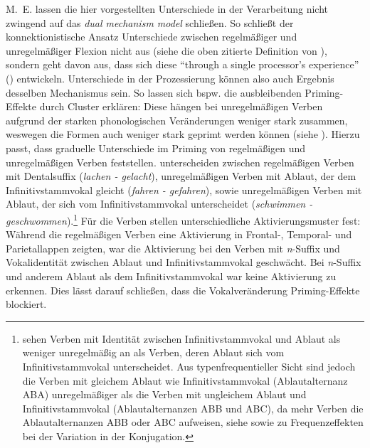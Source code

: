 M.~E. lassen die hier vorgestellten Unterschiede in der Verarbeitung nicht zwingend auf das \textit{dual mechanism model} schließen. So schließt der konnektionistische Ansatz Unterschiede zwischen regelmäßiger und unregelmäßiger Flexion nicht aus (siehe die oben zitierte Definition von \cite{Hare.2001}), sondern geht davon aus, dass sich diese "`through a single processor's experience"' (\cite[183]{Hare.2001}) entwickeln. Unterschiede in der Prozessierung können also auch Ergebnis desselben Mechanismus sein. So lassen sich bspw. die ausbleibenden Priming-Effekte durch Cluster erklären: Diese hängen bei unregelmäßigen Verben aufgrund der starken phonologischen Veränderungen weniger stark zusammen, weswegen die Formen auch weniger stark geprimt werden können (siehe ). Hierzu passt, dass \textcite{Smolka.2013} graduelle Unterschiede im Priming von regelmäßigen und unregelmäßigen Verben feststellen. \textcite[6--9]{Smolka.2013} unterscheiden zwischen regelmäßigen Verben mit Dentalsuffix (\textit{lachen - gelacht}), unregelmäßigen Verben mit Ablaut, der dem Infinitivstammvokal gleicht  (\textit{fahren - gefahren}),  sowie unregelmäßigen Verben mit Ablaut, der sich vom Infinitivstammvokal unterscheidet (\textit{schwimmen - geschwommen}).\footnote{\textcite[6--9]{Smolka.2013} sehen Verben mit Identität zwischen Infinitivstammvokal und Ablaut als weniger unregelmäßig an als Verben, deren Ablaut sich vom Infinitivstammvokal unterscheidet. Aus typenfrequentieller Sicht sind jedoch die Verben mit gleichem Ablaut wie Infinitivstammvokal (Ablaut\-alternanz ABA) unregelmäßiger als die Verben mit ungleichem Ablaut und Infinitivstammvokal (Ablaut\-alternanzen ABB und ABC), da mehr Verben die Ablautalternanzen ABB oder ABC aufweisen, siehe \textcite[159--161]{Nowak.2018} sowie  zu Frequenzeffekten bei der Variation in der Konjugation.} Für die Verben stellen \textcite[11--13]{Smolka.2013} unterschiedliche Aktivierungsmuster fest: Während die regelmäßigen Verben eine Aktivierung in Frontal-, Temporal- und Parietallappen zeigten, war die Aktivierung bei den Verben mit \textit{n}-Suffix und Vokalidentität zwischen Ablaut und Infinitivstammvokal geschwächt. Bei \textit{n}-Suffix und anderem Ablaut als dem Infinitivstammvokal war keine Aktivierung zu erkennen. Dies lässt darauf schließen, dass die Vokalveränderung Priming-Effekte blockiert. 
 
